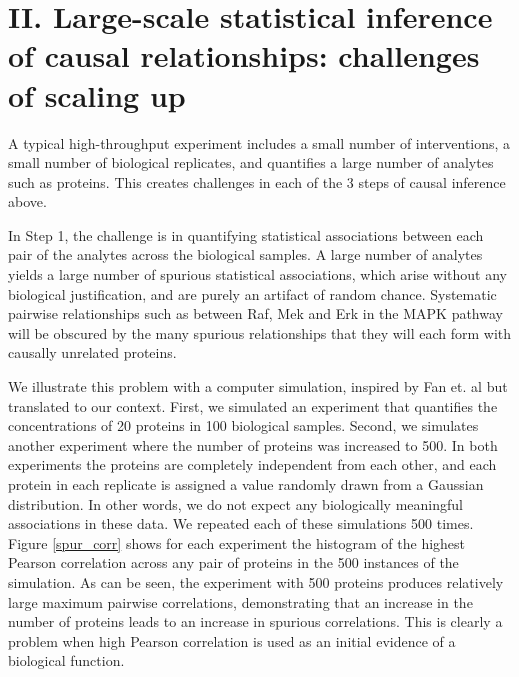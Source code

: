 \documentclass[journal=jacsat,manuscript=article]{achemso}
\begin{document}
\section{II. Large-scale statistical inference of causal relationships: challenges of scaling up}

A typical high-throughput experiment includes a small number of interventions, a small number of biological replicates, and quantifies a large number of analytes such as proteins. This creates challenges in each of the 3 steps of causal inference above.

In Step 1, the challenge is in quantifying statistical associations between each pair of the analytes across the biological samples. A large number of analytes  yields a large number of spurious statistical associations, which arise without any biological justification, and are purely an artifact of random chance. Systematic pairwise relationships such as between Raf, Mek and Erk in the MAPK pathway will be obscured by the many spurious relationships that they will each form with causally unrelated proteins.

We illustrate this problem with a computer simulation, inspired by Fan et. al \cite{fan2014challenges} but translated to our context. First, we simulated an experiment that quantifies the concentrations of 20 proteins in 100 biological samples.  Second, we simulates another experiment where the number of proteins was increased to 500.  In both experiments the proteins are completely independent from each other, and each protein in each replicate is assigned a value randomly drawn from a Gaussian distribution. In other words, we do not expect any biologically meaningful associations in these data. We repeated each of these simulations 500 times. Figure \ref{spur_corr} shows for each experiment the histogram of the highest Pearson correlation across any pair of proteins in the 500 instances of the simulation. As can be seen, the experiment with 500 proteins produces relatively large maximum pairwise correlations, demonstrating that an increase in the number of proteins leads to an increase in spurious correlations.  This is clearly a problem when high Pearson correlation is used as an initial evidence of a biological function.
\end{document}
